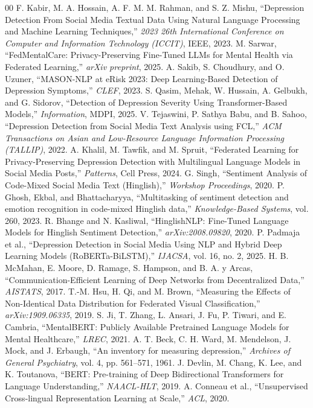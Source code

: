 \documentclass[conference]{IEEEtran}
\begin{document}
\begin{thebibliography}{00}
 F. Kabir, M. A. Hossain, A. F. M. M. Rahman, and S. Z. Mishu, ``Depression Detection From Social Media Textual Data Using Natural Language Processing and Machine Learning Techniques,'' \textit{2023 26th International Conference on Computer and Information Technology (ICCIT)}, IEEE, 2023.
 M. Sarwar, ``FedMentalCare: Privacy-Preserving Fine-Tuned LLMs for Mental Health via Federated Learning,'' \textit{arXiv preprint}, 2025.
 A. Sakib, S. Choudhury, and O. Uzuner, ``MASON-NLP at eRisk 2023: Deep Learning-Based Detection of Depression Symptoms,'' \textit{CLEF}, 2023.
 S. Qasim, Mehak, W. Hussain, A. Gelbukh, and G. Sidorov, ``Detection of Depression Severity Using Transformer-Based Models,'' \textit{Information}, MDPI, 2025.
 V. Tejaswini, P. Sathya Babu, and B. Sahoo, ``Depression Detection from Social Media Text Analysis using FCL,'' \textit{ACM Transactions on Asian and Low-Resource Language Information Processing (TALLIP)}, 2022.
 A. Khalil, M. Tawfik, and M. Spruit, ``Federated Learning for Privacy-Preserving Depression Detection with Multilingual Language Models in Social Media Posts,'' \textit{Patterns}, Cell Press, 2024.
 G. Singh, ``Sentiment Analysis of Code-Mixed Social Media Text (Hinglish),'' \textit{Workshop Proceedings}, 2020.
 P. Ghosh, Ekbal, and Bhattacharyya, ``Multitasking of sentiment detection and emotion recognition in code-mixed Hinglish data,'' \textit{Knowledge-Based Systems}, vol. 260, 2023.
 R. Bhange and N. Kasliwal, ``HinglishNLP: Fine-Tuned Language Models for Hinglish Sentiment Detection,'' \textit{arXiv:2008.09820}, 2020.
 P. Padmaja et al., ``Depression Detection in Social Media Using NLP and Hybrid Deep Learning Models (RoBERTa-BiLSTM),'' \textit{IJACSA}, vol. 16, no. 2, 2025.
 H. B. McMahan, E. Moore, D. Ramage, S. Hampson, and B. A. y Arcas, ``Communication-Efficient Learning of Deep Networks from Decentralized Data,'' \textit{AISTATS}, 2017.
 T.-M. Hsu, H. Qi, and M. Brown, ``Measuring the Effects of Non-Identical Data Distribution for Federated Visual Classification,'' \textit{arXiv:1909.06335}, 2019.
 S. Ji, T. Zhang, L. Ansari, J. Fu, P. Tiwari, and E. Cambria, ``MentalBERT: Publicly Available Pretrained Language Models for Mental Healthcare,'' \textit{LREC}, 2021.
 A. T. Beck, C. H. Ward, M. Mendelson, J. Mock, and J. Erbaugh, ``An inventory for measuring depression,'' \textit{Archives of General Psychiatry}, vol. 4, pp. 561--571, 1961.
 J. Devlin, M. Chang, K. Lee, and K. Toutanova, ``BERT: Pre-training of Deep Bidirectional Transformers for Language Understanding,'' \textit{NAACL-HLT}, 2019.
 A. Conneau et al., ``Unsupervised Cross-lingual Representation Learning at Scale,'' \textit{ACL}, 2020.
\end{thebibliography}
\end{document}
